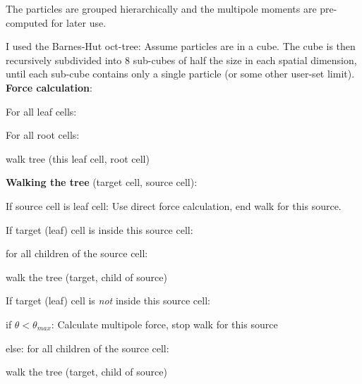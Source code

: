 




\begin{frame}
	The particles are grouped hierarchically and the multipole moments are pre-computed for later use.
	
	I used the Barnes-Hut oct-tree: Assume particles are in a cube. The cube is then recursively subdivided into 8 sub-cubes of half the size in each spatial dimension, until each sub-cube contains only a single particle (or some other user-set limit).\\[1em]
	
	\textbf{Force calculation}: 
	
	For all leaf cells:
	
	\quad For all root cells:
	
	\quad\quad walk tree (this leaf cell, root cell)
	
	
	
\end{frame}




\begin{frame}
	\textbf{Walking the tree} (target cell, source cell):
	

	If source cell is leaf cell: Use direct force calculation, end walk for this source.
	
	If target (leaf) cell is inside this source cell:
	
	\quad for all children of the source cell:
	
	\quad \quad walk the tree (target, child of source)


	If target (leaf) cell is \textit{not} inside this source cell:
	
	\quad if $\theta < \theta_{max}$: Calculate multipole force, stop walk for this source
	
	\quad else: for all children of the source cell:
	
	\quad \quad walk the tree (target, child of source)
\end{frame}







